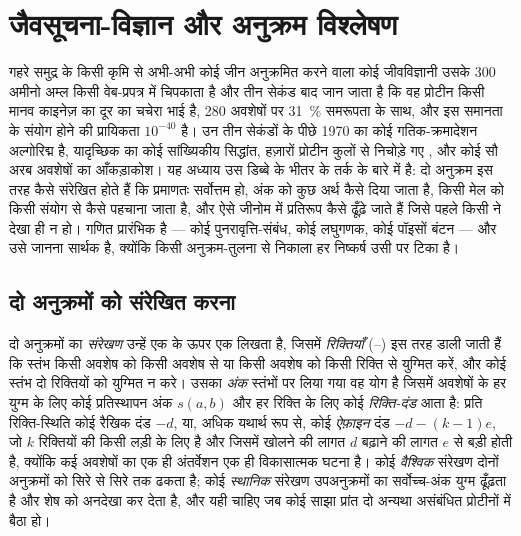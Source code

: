 \chapter{जैवसूचना-विज्ञान और अनुक्रम विश्लेषण}\label{ch:b3:bioinformatics}

गहरे समुद्र के किसी कृमि से अभी-अभी कोई जीन अनुक्रमित करने वाला कोई
जीवविज्ञानी उसके \num{300} अमीनो अम्ल किसी वेब-प्रपत्र में चिपकाता है
और तीन सेकंड बाद जान जाता है कि वह प्रोटीन किसी मानव काइनेज़ का दूर का
चचेरा भाई है, \num{280} अवशेषों पर \qty{31}{\%} समरूपता के साथ, और इस
समानता के संयोग होने की प्रायिकता $10^{-40}$ है। उन तीन सेकंडों के पीछे
1970 का कोई गतिक-क्रमादेशन अल्गोरिद्म है, यादृच्छिक  का कोई
सांख्यिकीय सिद्धांत, हज़ारों प्रोटीन कुलों से निचोड़े गए , और कोई सौ अरब अवशेषों का आँकड़ाकोश। यह अध्याय उस डिब्बे के भीतर
के तर्क के बारे में है: दो अनुक्रम इस तरह कैसे संरेखित होते हैं कि
 प्रमाणतः सर्वोत्तम हो, अंक को कुछ अर्थ कैसे दिया जाता है, किसी
मेल को किसी संयोग से कैसे पहचाना जाता है, और ऐसे जीनोम में प्रतिरूप
कैसे ढूँढ़े जाते हैं जिसे पहले किसी ने देखा ही न हो। गणित प्रारंभिक है
--- कोई पुनरावृत्ति-संबंध, कोई लघुगणक, कोई पॉइसों बंटन --- और उसे जानना
सार्थक है, क्योंकि किसी अनुक्रम-तुलना से निकाला हर निष्कर्ष उसी पर टिका है।

\section{दो अनुक्रमों को संरेखित करना}

\begin{definition}[संरेखण और अंक]\label{def:b3:bioinformatics:alignment}
दो अनुक्रमों का \emph{संरेखण} उन्हें एक के ऊपर एक लिखता है, जिसमें
\emph{रिक्तियाँ} (--) इस तरह डाली जाती हैं कि स्तंभ किसी अवशेष को किसी
अवशेष से या किसी अवशेष को किसी रिक्ति से युग्मित करें, और कोई स्तंभ दो
रिक्तियों को युग्मित न करे। उसका \emph{अंक} स्तंभों पर लिया गया वह योग
है जिसमें अवशेषों के हर युग्म के लिए कोई प्रतिस्थापन अंक $s(a,b)$ और हर
रिक्ति के लिए कोई \emph{रिक्ति-दंड} आता है: प्रति रिक्ति-स्थिति कोई
रैखिक दंड $-d$, या, अधिक यथार्थ रूप से, कोई \emph{ऐफ़ाइन} दंड
$-d - (k-1)e$, जो $k$ रिक्तियों की किसी लड़ी के लिए है और जिसमें खोलने की लागत $d$
बढ़ाने की लागत $e$ से बड़ी होती है, क्योंकि कई अवशेषों का एक ही
अंतर्वेशन एक ही विकासात्मक घटना है। कोई \emph{वैश्विक} संरेखण दोनों
अनुक्रमों को सिरे से सिरे तक ढकता है; कोई \emph{स्थानिक} संरेखण
उपअनुक्रमों का सर्वोच्च-अंक युग्म ढूँढ़ता है और शेष को अनदेखा कर देता
है, और यही चाहिए जब कोई साझा प्रांत दो अन्यथा असंबंधित प्रोटीनों में
बैठा हो।
\end{definition}

